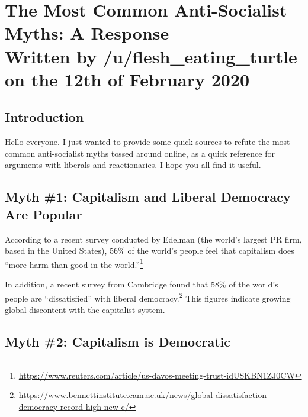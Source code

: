 \section[The Most Common Anti-Socialist Myths]{The Most Common Anti-Socialist Myths: A Response\\\small{Written by /u/flesh\_eating\_turtle on the 12th of February 2020}}
\subsection*{Introduction}

Hello everyone.
I just wanted to provide some quick sources to refute the most common anti-socialist myths tossed around online, as a quick reference for arguments with liberals and reactionaries.
I hope you all find it useful.

\subsection*{Myth \#1: Capitalism and Liberal Democracy Are Popular}

According to a recent survey conducted by Edelman (the world's largest PR firm, based in the United States), 56\% of the world's people feel that capitalism does ``more harm than good in the world.''\footnote{\href{https://www.reuters.com/article/us-davos-meeting-trust-idUSKBN1ZJ0CW}{https://www.reuters.com/article/us-davos-meeting-trust-idUSKBN1ZJ0CW}}

In addition, a recent survey from Cambridge found that 58\% of the world's people are ``dissatisfied'' with liberal democracy.\footnote{\href{https://www.bennettinstitute.cam.ac.uk/news/global-dissatisfaction-democracy-record-high-new-c/}{https://www.bennettinstitute.cam.ac.uk/news/global-dissatisfaction-democracy-record-high-new-c/}}
This figures indicate growing global discontent with the capitalist system.

\subsection*{Myth \#2: Capitalism is Democratic}

